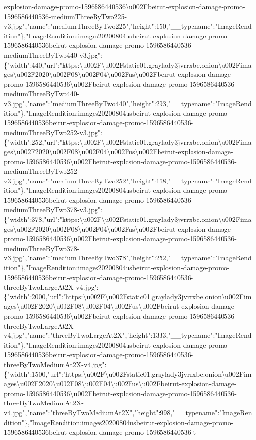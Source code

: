 explosion-damage-promo-1596586440536\textbackslash{}u002Fbeirut-explosion-damage-promo-1596586440536-mediumThreeByTwo225-v3.jpg","name":"mediumThreeByTwo225","height":150,"\_\_typename":"ImageRendition"\},"ImageRendition:images20200804usbeirut-explosion-damage-promo-1596586440536beirut-explosion-damage-promo-1596586440536-mediumThreeByTwo440-v3.jpg":\{"width":440,"url":"https:\textbackslash{}u002F\textbackslash{}u002Fstatic01.graylady3jvrrxbe.onion\textbackslash{}u002Fimages\textbackslash{}u002F2020\textbackslash{}u002F08\textbackslash{}u002F04\textbackslash{}u002Fus\textbackslash{}u002Fbeirut-explosion-damage-promo-1596586440536\textbackslash{}u002Fbeirut-explosion-damage-promo-1596586440536-mediumThreeByTwo440-v3.jpg","name":"mediumThreeByTwo440","height":293,"\_\_typename":"ImageRendition"\},"ImageRendition:images20200804usbeirut-explosion-damage-promo-1596586440536beirut-explosion-damage-promo-1596586440536-mediumThreeByTwo252-v3.jpg":\{"width":252,"url":"https:\textbackslash{}u002F\textbackslash{}u002Fstatic01.graylady3jvrrxbe.onion\textbackslash{}u002Fimages\textbackslash{}u002F2020\textbackslash{}u002F08\textbackslash{}u002F04\textbackslash{}u002Fus\textbackslash{}u002Fbeirut-explosion-damage-promo-1596586440536\textbackslash{}u002Fbeirut-explosion-damage-promo-1596586440536-mediumThreeByTwo252-v3.jpg","name":"mediumThreeByTwo252","height":168,"\_\_typename":"ImageRendition"\},"ImageRendition:images20200804usbeirut-explosion-damage-promo-1596586440536beirut-explosion-damage-promo-1596586440536-mediumThreeByTwo378-v3.jpg":\{"width":378,"url":"https:\textbackslash{}u002F\textbackslash{}u002Fstatic01.graylady3jvrrxbe.onion\textbackslash{}u002Fimages\textbackslash{}u002F2020\textbackslash{}u002F08\textbackslash{}u002F04\textbackslash{}u002Fus\textbackslash{}u002Fbeirut-explosion-damage-promo-1596586440536\textbackslash{}u002Fbeirut-explosion-damage-promo-1596586440536-mediumThreeByTwo378-v3.jpg","name":"mediumThreeByTwo378","height":252,"\_\_typename":"ImageRendition"\},"ImageRendition:images20200804usbeirut-explosion-damage-promo-1596586440536beirut-explosion-damage-promo-1596586440536-threeByTwoLargeAt2X-v4.jpg":\{"width":2000,"url":"https:\textbackslash{}u002F\textbackslash{}u002Fstatic01.graylady3jvrrxbe.onion\textbackslash{}u002Fimages\textbackslash{}u002F2020\textbackslash{}u002F08\textbackslash{}u002F04\textbackslash{}u002Fus\textbackslash{}u002Fbeirut-explosion-damage-promo-1596586440536\textbackslash{}u002Fbeirut-explosion-damage-promo-1596586440536-threeByTwoLargeAt2X-v4.jpg","name":"threeByTwoLargeAt2X","height":1333,"\_\_typename":"ImageRendition"\},"ImageRendition:images20200804usbeirut-explosion-damage-promo-1596586440536beirut-explosion-damage-promo-1596586440536-threeByTwoMediumAt2X-v4.jpg":\{"width":1500,"url":"https:\textbackslash{}u002F\textbackslash{}u002Fstatic01.graylady3jvrrxbe.onion\textbackslash{}u002Fimages\textbackslash{}u002F2020\textbackslash{}u002F08\textbackslash{}u002F04\textbackslash{}u002Fus\textbackslash{}u002Fbeirut-explosion-damage-promo-1596586440536\textbackslash{}u002Fbeirut-explosion-damage-promo-1596586440536-threeByTwoMediumAt2X-v4.jpg","name":"threeByTwoMediumAt2X","height":998,"\_\_typename":"ImageRendition"\},"ImageRendition:images20200804usbeirut-explosion-damage-promo-1596586440536beirut-explosion-damage-promo-1596586440536-t